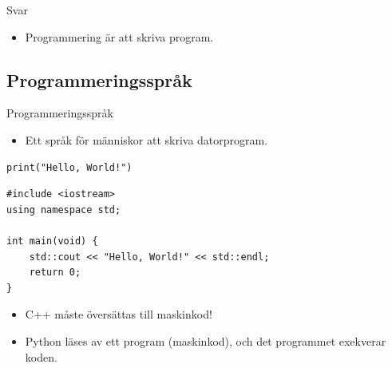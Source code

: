 \begin{frame}
  \begin{block}{Svar}
    \begin{itemize}
      \item Programmering är att skriva program.
    \end{itemize}
  \end{block}
\end{frame}


\subsection{Programmeringsspråk}

\begin{frame}
  \begin{block}{Programmeringsspråk}
    \begin{itemize}
      \item Ett språk för människor att skriva datorprogram.
    \end{itemize}
  \end{block}
\end{frame}

\begin{frame}[fragile]
  \begin{example}[Python]
    \begin{verbatim}
print("Hello, World!")
    \end{verbatim}
  \end{example}

  \pause

  \begin{example}[C++]
    \begin{verbatim}
#include <iostream>
using namespace std;

int main(void) {
    std::cout << "Hello, World!" << std::endl;
    return 0;
}
    \end{verbatim}
  \end{example}
\end{frame}

\begin{frame}
  \begin{remark}
    \begin{itemize}
      \item C++ måste översättas till maskinkod!
      \item Python läses av ett program (maskinkod), och det programmet 
        exekverar koden.
    \end{itemize}
  \end{remark}
\end{frame}

